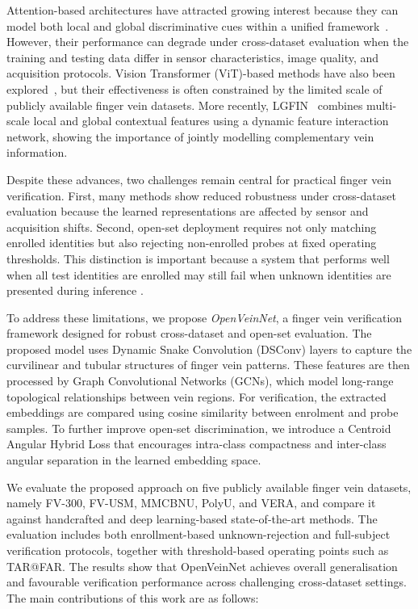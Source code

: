\documentclass[10pt,journal,compsoc]{IEEEtran}
\begin{document}
Attention-based architectures have attracted growing interest because they can model both local and global discriminative cues within a unified framework~\cite{arcvein, binma, 2022_2, 2023_1, 2023_2, 2023_3, 2023_4, 2023_5, vit, veinatnnet, 2024_1, 2024_2}. However, their performance can degrade under cross-dataset evaluation when the training and testing data differ in sensor characteristics, image quality, and acquisition protocols. Vision Transformer (ViT)-based methods have also been explored~\cite{2022_2, vit}, but their effectiveness is often constrained by the limited scale of publicly available finger vein datasets. More recently, LGFIN~\cite{lgfin} combines multi-scale local and global contextual features using a dynamic feature interaction network, showing the importance of jointly modelling complementary vein information.

Despite these advances, two challenges remain central for practical finger vein verification. First, many methods show reduced robustness under cross-dataset evaluation because the learned representations are affected by sensor and acquisition shifts. Second, open-set deployment requires not only matching enrolled identities but also rejecting non-enrolled probes at fixed operating thresholds. This distinction is important because a system that performs well when all test identities are enrolled may still fail when unknown identities are presented during inference \cite{chenresnetarcloss}.

To address these limitations, we propose \emph{OpenVeinNet}, a finger vein verification framework designed for robust cross-dataset and open-set evaluation. The proposed model uses Dynamic Snake Convolution (DSConv) layers to capture the curvilinear and tubular structures of finger vein patterns. These features are then processed by Graph Convolutional Networks (GCNs), which model long-range topological relationships between vein regions. For verification, the extracted embeddings are compared using cosine similarity between enrolment and probe samples. To further improve open-set discrimination, we introduce a Centroid Angular Hybrid Loss that encourages intra-class compactness and inter-class angular separation in the learned embedding space.

We evaluate the proposed approach on five publicly available finger vein datasets, namely FV-300, FV-USM, MMCBNU, PolyU, and VERA, and compare it against handcrafted and deep learning-based state-of-the-art methods. The evaluation includes both enrollment-based unknown-rejection and full-subject verification protocols, together with threshold-based operating points such as TAR@FAR. The results show that OpenVeinNet achieves  overall generalisation and favourable verification performance across challenging cross-dataset settings. The main contributions of this work are as follows:
\end{document}
